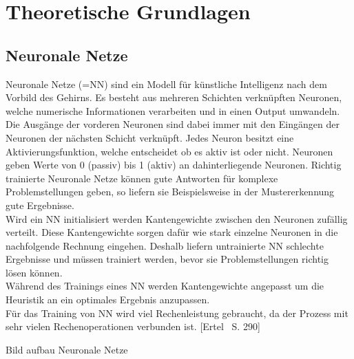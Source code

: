 

\clearpage
\chapter{Theoretische Grundlagen}
\section{Neuronale Netze}
Neuronale Netze (=NN) sind ein Modell für künstliche Intelligenz nach dem Vorbild des Gehirns.
Es besteht aus mehreren Schichten verknüpften Neuronen, welche numerische Informationen verarbeiten und in einen Output umwandeln. Die Ausgänge der vorderen Neuronen sind dabei immer mit den Eingängen der Neuronen der nächsten Schicht verknüpft.
Jedes Neuron besitzt eine Aktivierungsfunktion, welche entscheidet ob es aktiv ist oder nicht. Neuronen geben Werte von 0 (passiv) bis 1 (aktiv) an dahinterliegende Neuronen.
Richtig trainierte Neuronale Netze können gute Antworten für komplexe Problemstellungen geben, so liefern sie Beispielsweise in der Mustererkennung gute Ergebnisse.\\
Wird ein NN initialisiert werden Kantengewichte zwischen den Neuronen zufällig verteilt. Diese Kantengewichte sorgen dafür wie stark einzelne Neuronen in die nachfolgende Rechnung eingehen.
Deshalb liefern untrainierte NN schlechte Ergebnisse und müssen trainiert werden, bevor sie Problemstellungen richtig lösen können. \\
Während des Trainings eines NN werden Kantengewichte angepasst um die Heuristik  an ein optimales Ergebnis anzupassen. \\
Für das Training von NN wird viel Rechenleistung gebraucht, da der Prozess mit sehr vielen Rechenoperationen verbunden ist.
[Ertel ~S. 290]

Bild aufbau Neuronale Netze


